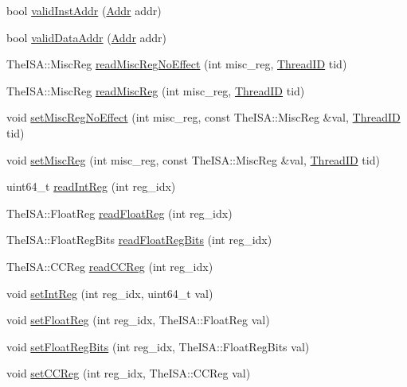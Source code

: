 \begin{DoxyCompactItemize}
\item 
bool \hyperlink{classFullO3CPU_af5f6a59bc2ed83b0cf9203ba8c63bf34}{validInstAddr} (\hyperlink{base_2types_8hh_af1bb03d6a4ee096394a6749f0a169232}{Addr} addr)
\item 
bool \hyperlink{classFullO3CPU_afe01e4cef8897b8a4ff99d575875c9db}{validDataAddr} (\hyperlink{base_2types_8hh_af1bb03d6a4ee096394a6749f0a169232}{Addr} addr)
\item 
TheISA::MiscReg \hyperlink{classFullO3CPU_adab97969b95d7b02e858364997dd7968}{readMiscRegNoEffect} (int misc\_\-reg, \hyperlink{base_2types_8hh_ab39b1a4f9dad884694c7a74ed69e6a6b}{ThreadID} tid)
\item 
TheISA::MiscReg \hyperlink{classFullO3CPU_ae9d0992c10f59b8dc47ea56b3a778c32}{readMiscReg} (int misc\_\-reg, \hyperlink{base_2types_8hh_ab39b1a4f9dad884694c7a74ed69e6a6b}{ThreadID} tid)
\item 
void \hyperlink{classFullO3CPU_acd6f1f298148bb7eebfa8c800c4066e2}{setMiscRegNoEffect} (int misc\_\-reg, const TheISA::MiscReg \&val, \hyperlink{base_2types_8hh_ab39b1a4f9dad884694c7a74ed69e6a6b}{ThreadID} tid)
\item 
void \hyperlink{classFullO3CPU_a880c4c099ed7676fcbc9f76989e400b7}{setMiscReg} (int misc\_\-reg, const TheISA::MiscReg \&val, \hyperlink{base_2types_8hh_ab39b1a4f9dad884694c7a74ed69e6a6b}{ThreadID} tid)
\item 
uint64\_\-t \hyperlink{classFullO3CPU_a21c850cd41ab977a2cf3450fe66ec25a}{readIntReg} (int reg\_\-idx)
\item 
TheISA::FloatReg \hyperlink{classFullO3CPU_a2f97d83baef4fbda00b7f7f62779752f}{readFloatReg} (int reg\_\-idx)
\item 
TheISA::FloatRegBits \hyperlink{classFullO3CPU_a4998e6615f835676762af364eff198e3}{readFloatRegBits} (int reg\_\-idx)
\item 
TheISA::CCReg \hyperlink{classFullO3CPU_ac3d147c535052bfb1f8e8fe0697168d7}{readCCReg} (int reg\_\-idx)
\item 
void \hyperlink{classFullO3CPU_abc264e8ee37c6bd7d7b5759b97c34356}{setIntReg} (int reg\_\-idx, uint64\_\-t val)
\item 
void \hyperlink{classFullO3CPU_ab4fbd29dd25664125eb83aa0d1c45a96}{setFloatReg} (int reg\_\-idx, TheISA::FloatReg val)
\item 
void \hyperlink{classFullO3CPU_ad25b1101e69d1987937252f44c48fb96}{setFloatRegBits} (int reg\_\-idx, TheISA::FloatRegBits val)
\item 
void \hyperlink{classFullO3CPU_ab41bd7f1c28d09676694843602e180b6}{setCCReg} (int reg\_\-idx, TheISA::CCReg val)

\end{DoxyCompactItemize}
